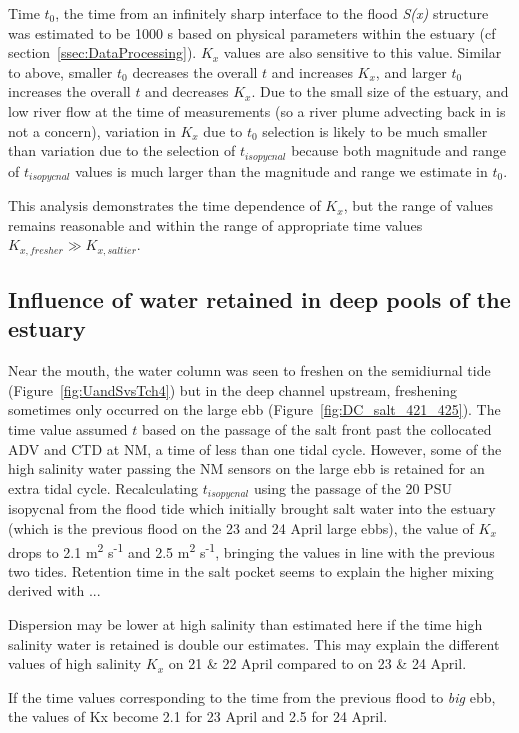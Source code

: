 Time $t_0$, the time from an infinitely sharp interface to the flood \emph{S(x)} structure was estimated to be 1000 s based on physical parameters within the estuary (cf section~\ref{ssec:DataProcessing}). $K_x$ values are also sensitive to this value. Similar to above, smaller $t_0$ decreases the overall $t$ and increases $K_x$, and larger $t_0$ increases the overall $t$ and decreases $K_x$. Due to the small size of the estuary, and low river flow at the time of measurements (so a river plume advecting back in is not a concern), variation in $K_x$ due to $t_0$ selection is likely to be much smaller than variation due to the selection of $t_{isopycnal}$ because both magnitude and range of $t_{isopycnal}$ values is much larger than the magnitude and range we estimate in  $t_0$.

This analysis demonstrates the time dependence of $K_x$, but the range of values remains reasonable and within the range of appropriate time values $K_{x,fresher}\gg K_{x,saltier}$. 

\subsection{Influence of water retained in deep pools of the estuary}
Near the mouth, the water column was seen to freshen on the semidiurnal tide (Figure~\ref{fig:UandSvsTch4}) but in the deep channel upstream, freshening sometimes only occurred on the large ebb (Figure~\ref{fig:DC_salt_421_425}). The time value assumed $t$ based on the passage of the salt front past the collocated ADV and CTD at NM, a time of less than one tidal cycle. However, some of the high salinity water passing the NM sensors on the large ebb is retained for an extra tidal cycle. Recalculating $t_{isopycnal}$ using the passage of the 20 PSU isopycnal from the flood tide which initially brought salt water into the estuary (which is the previous flood on the 23 and 24 April large ebbs), the value of $K_x$ drops to 2.1 m\textsuperscript{2} s\textsuperscript{-1} and 2.5 m\textsuperscript{2} s\textsuperscript{-1}, bringing the values in line with the previous two tides. Retention time in the salt pocket seems to explain the higher mixing derived with ... 

Dispersion may be lower at high salinity than estimated here if the time high salinity water is retained is double our estimates. This may explain the different values of high salinity $K_x$ on 21 \& 22 April compared to on 23 \& 24 April. 

If the time values corresponding to the time from the previous flood to \emph{big} ebb, the values of Kx become 2.1 for 23 April and 2.5 for 24 April. 



